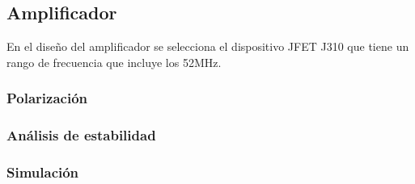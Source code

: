 \subsection{Amplificador}
En el diseño del amplificador se selecciona el dispositivo JFET J310 que tiene un rango de frecuencia que incluye los 52MHz.

\subsubsection{Polarización}
\subsubsection{Análisis de estabilidad}
\subsubsection{Simulación}